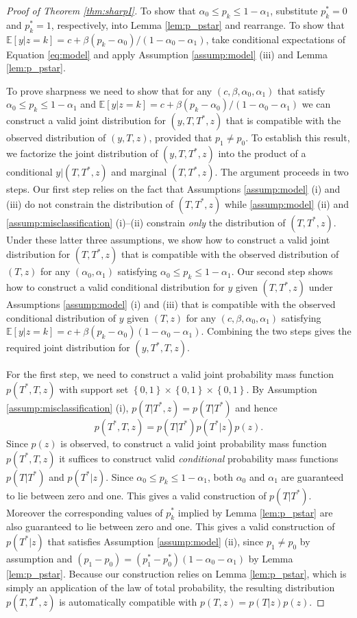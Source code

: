 \begin{proof}[Proof of Theorem \ref{thm:sharpI}]
  To show that $\alpha_0 \leq p_k \leq 1 - \alpha_1$,  substitute $p_k^*=0$ and $p_k^*=1$, respectively, into Lemma \ref{lem:p_pstar} and rearrange.
  To show that $\mathbb{E}[y|z=k] = c + \beta(p_k - \alpha_0) / (1 - \alpha_0 - \alpha_1)$, take conditional expectations of Equation \ref{eq:model} and apply Assumption \ref{assump:model} (iii) and Lemma \ref{lem:p_pstar}.

To prove sharpness we need to show that for any $(c,\beta, \alpha_0, \alpha_1)$ that satisfy $\alpha_0 \leq p_k \leq 1 - \alpha_1$ and $\mathbb{E}[y|z=k] = c + \beta(p_k - \alpha_0)/(1 - \alpha_0 - \alpha_1)$  we can construct a valid joint distribution for $(y,T,T^*,z)$ that is compatible with the observed distribution of $(y,T,z)$, provided that $p_1 \neq p_0$.
To establish this result, we factorize the joint distribution of $(y,T,T^*,z)$ into the product of a conditional $y|(T,T^*,z)$ and marginal $(T,T^*,z)$.
The argument proceeds in two steps.
Our first step relies on the fact that Assumptions \ref{assump:model} (i) and (iii) do not constrain the distribution of $(T,T^*,z)$ while \ref{assump:model} (ii) and \ref{assump:misclassification} (i)--(ii) constrain \emph{only} the distribution of $(T,T^*,z)$.
Under these latter three assumptions, we show how to construct a valid joint distribution for $(T,T^*,z)$ that is compatible with the observed distribution of $(T,z)$ for any $(\alpha_0,\alpha_1)$ satisfying $\alpha_0 \leq p_k \leq 1 - \alpha_1$.
Our second step shows how to construct a valid conditional distribution for $y$ given $(T,T^*,z)$ under Assumptions \ref{assump:model} (i) and (iii) that is compatible with the observed conditional distribution of $y$ given $(T,z)$ for any $(c,\beta,\alpha_0, \alpha_1)$ satisfying $\mathbb{E}[y|z=k] = c + \beta (p_k - \alpha_0)(1 - \alpha_0 - \alpha_1)$.
Combining the two steps gives the required joint distribution for $(y,T^*,T,z)$.

For the first step, we need to construct a valid joint probability mass function $p(T^*,T,z)$ with support set $\left\{ 0,1 \right\} \times \left\{ 0,1 \right\} \times \left\{ 0,1 \right\}$.
 By Assumption \ref{assump:misclassification} (i), $p(T|T^*,z) = p(T|T^*)$ and hence 
\[
  p(T^*,T,z) = p(T|T^*)p(T^*|z)p(z).
\]
Since $p(z)$ is observed, to construct a valid joint probability mass function $p(T^*,T,z)$ it suffices to construct valid \emph{conditional} probability mass functions $p(T|T^*)$ and $p(T^*|z)$.
Since $\alpha_0 \leq p_k \leq 1 - \alpha_1$, both $\alpha_0$ and $\alpha_1$ are guaranteed to lie between zero and one.
This gives a valid construction of $p(T|T^*)$.
Moreover the corresponding values of $p_k^*$ implied by Lemma \ref{lem:p_pstar} are also guaranteed to lie between zero and one.
This gives a valid construction of $p(T^*|z)$ that satisfies Assumption \ref{assump:model} (ii), since $p_1 \neq p_0$ by assumption and $(p_1 - p_0) = (p_1^* - p_0^*)(1 - \alpha_0 - \alpha_1)$ by Lemma \ref{lem:p_pstar}.
Because our construction relies on Lemma \ref{lem:p_pstar}, which is simply an application of the law of total probability, the resulting distribution $p(T,T^*,z)$ is automatically compatible with $p(T,z) = p(T|z)p(z)$.


\end{proof}
